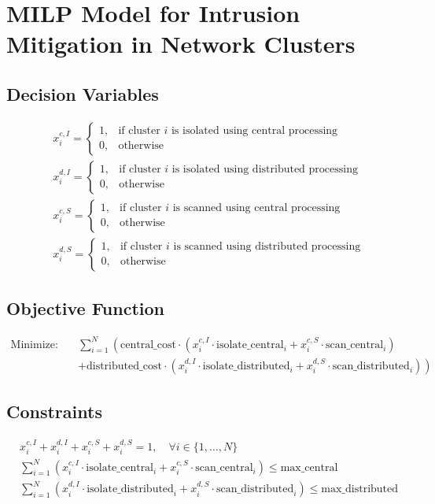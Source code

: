 \documentclass{article}
\begin{document}
\section*{MILP Model for Intrusion Mitigation in Network Clusters}

\subsection*{Decision Variables}
\begin{align*}
    &x_{i}^{c,I} = 
    \begin{cases} 
    1, & \text{if cluster } i \text{ is isolated using central processing} \\ 
    0, & \text{otherwise}
    \end{cases}\\
    &x_{i}^{d,I} = 
    \begin{cases} 
    1, & \text{if cluster } i \text{ is isolated using distributed processing} \\ 
    0, & \text{otherwise}
    \end{cases}\\
    &x_{i}^{c,S} = 
    \begin{cases} 
    1, & \text{if cluster } i \text{ is scanned using central processing} \\ 
    0, & \text{otherwise}
    \end{cases}\\
    &x_{i}^{d,S} = 
    \begin{cases} 
    1, & \text{if cluster } i \text{ is scanned using distributed processing} \\ 
    0, & \text{otherwise}
    \end{cases}
\end{align*}

\subsection*{Objective Function}
\begin{align*}
    \text{Minimize:} \quad & \sum_{i=1}^{N} \left( \text{central\_cost} \cdot (x_{i}^{c,I} \cdot \text{isolate\_central}_i + x_{i}^{c,S} \cdot \text{scan\_central}_i) \right. \\
    & \left. + \text{distributed\_cost} \cdot (x_{i}^{d,I} \cdot \text{isolate\_distributed}_i + x_{i}^{d,S} \cdot \text{scan\_distributed}_i) \right)
\end{align*}

\subsection*{Constraints}
\begin{align*}
    &x_{i}^{c,I} + x_{i}^{d,I} + x_{i}^{c,S} + x_{i}^{d,S} = 1, \quad \forall i \in \{1, \ldots, N\} \\
    &\sum_{i=1}^{N} (x_{i}^{c,I} \cdot \text{isolate\_central}_i + x_{i}^{c,S} \cdot \text{scan\_central}_i) \leq \text{max\_central} \\
    &\sum_{i=1}^{N} (x_{i}^{d,I} \cdot \text{isolate\_distributed}_i + x_{i}^{d,S} \cdot \text{scan\_distributed}_i) \leq \text{max\_distributed}
\end{align*}
\end{document}
